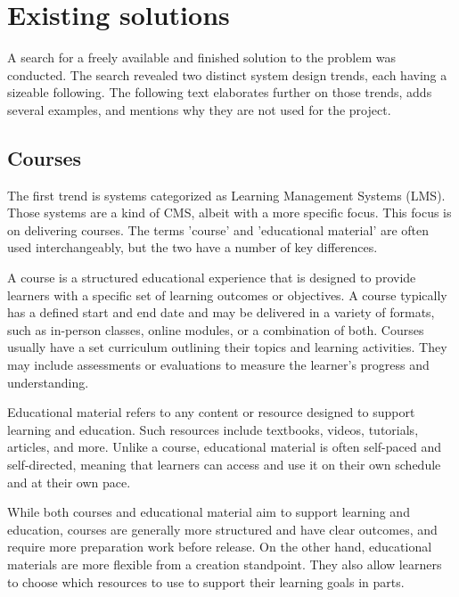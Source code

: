 \documentclass[
  digital,     %
  oneside,     %
  nosansbold,  %
  colorbold, %
  lof,         %
  lot,         %
]{fithesis4}
\begin{document}
\section{Existing solutions}

A search for a freely available and finished solution to the problem was conducted. The search revealed two distinct system design trends, each having a sizeable following. The following text elaborates further on those trends, adds several examples, and mentions why they are not used for the project.

\subsection{Courses}

The first trend is systems categorized as Learning Management Systems (LMS). Those systems are a kind of CMS, albeit with a more specific focus. This focus is on delivering courses. The terms 'course' and 'educational material' are often used interchangeably, but the two have a number of key differences.

A course is a structured educational experience that is designed to provide learners with a specific set of learning outcomes or objectives. A course typically has a defined start and end date and may be delivered in a variety of formats, such as in-person classes, online modules, or a combination of both. Courses usually have a set curriculum outlining their topics and learning activities. They may include assessments or evaluations to measure the learner's progress and understanding.

Educational material refers to any content or resource designed to support learning and education. Such resources include textbooks, videos, tutorials, articles, and more. Unlike a course, educational material is often self-paced and self-directed, meaning that learners can access and use it on their own schedule and at their own pace.

While both courses and educational material aim to support learning and education, courses are generally more structured and have clear outcomes, and require more preparation work before release. On the other hand, educational materials are more flexible from a creation standpoint. They also allow learners to choose which resources to use to support their learning goals in parts.
\end{document}
